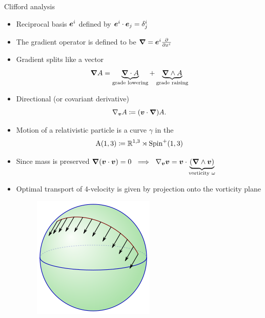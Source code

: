 \documentclass[aspectratio=169]{beamer}
\begin{document}
\begin{frame}{Clifford analysis}
\vfill
\begin{itemize}
	\item Reciprocal basis $\boldsymbol{e}^i$ defined by $\boldsymbol{e}^i \cdot \boldsymbol{e}_j = \delta^i_j$
	\item The gradient operator is defined to be $\boldsymbol{\nabla} = \boldsymbol{e}^i \frac{\partial}{\partial x^i}$
	\item Gradient splits like a vector
	\[
	\boldsymbol{\nabla} A = \underbrace{\boldsymbol{\nabla} \cdot A}_{\textrm{grade lowering}} + \underbrace{\boldsymbol{\nabla} \wedge A}_{\textrm{grade raising}}
	\]
	\item Directional (or covariant derivative)
	\[
	\nabla_{\boldsymbol{v}} A \coloneqq (\boldsymbol{v}\cdot \boldsymbol{\nabla})A.
	\]
\end{itemize}
\vfill
\end{frame}

\begin{frame}{}
\vfill
\begin{itemize}
	\item Motion of a relativistic particle is a curve $\gamma$ in the 
\[
\operatorname{A}(1,3) \coloneqq \mathbb{R}^{1,3}\rtimes \mathrm{Spin}^+(1,3)
\]

        \item Since mass is preserved $\boldsymbol{\nabla} ({\boldsymbol{v}} \cdot {\boldsymbol{v}}) = 0 ~\implies~ \nabla_{\boldsymbol{v}} {\boldsymbol{v}} =  {\boldsymbol{v}}\cdot \underbrace{(\boldsymbol{\nabla} \wedge {\boldsymbol{v}})}_{\textrm{vorticity }\omega}$
        \item Optimal transport of 4-velocity is given by projection onto the vorticity plane
        \begin{figure}
            \centering
            \includegraphics[width=.2\textwidth]{figures/parallel_transport.png}
        \end{figure}
        \end{itemize}
\vfill
\end{frame}
\end{document}
